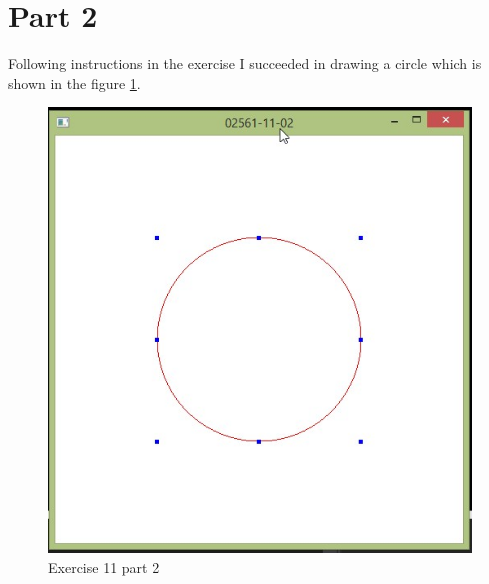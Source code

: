 \section{Part 2}
Following instructions in the exercise I succeeded in drawing a circle
which is shown in the figure \ref{fig:exercise_11_part_2}.
\begin{figure}[ht!]
	\begin{center}
		\includegraphics[width=.6\textwidth]{figures/exercise_11_part_2}
	\end{center}
	\vspace{-4.5ex}\caption{Exercise 11 part 2}
	\label{fig:exercise_11_part_2} 
\end{figure}

